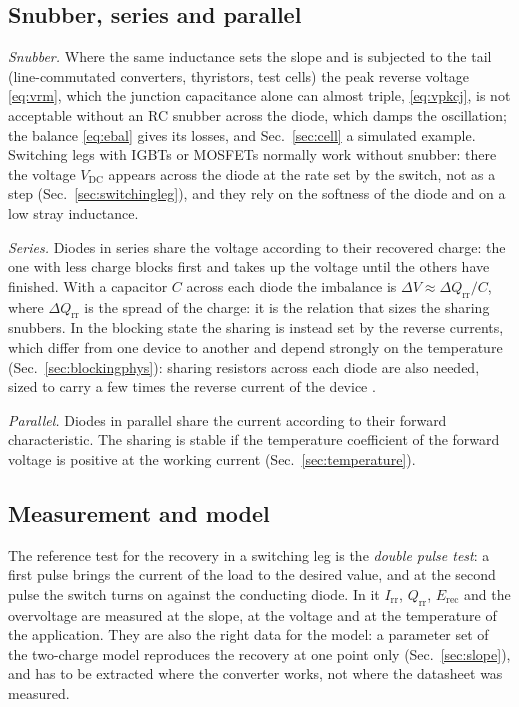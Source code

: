 \documentclass[10pt,a4paper]{scrartcl}
\newcommand{\Irr}{I_\mathrm{rr}}
\newcommand{\Qrr}{Q_\mathrm{rr}}
\newcommand{\Vdc}{V_\mathrm{DC}}
\newcommand{\Erec}{E_\mathrm{rec}}
\begin{document}
\subsection{Snubber, series and parallel}
\emph{Snubber.} Where the same inductance sets the slope and is subjected to the tail (line-commutated converters, thyristors, test cells) the peak reverse voltage \eqref{eq:vrm}, which the junction capacitance alone can almost triple, \eqref{eq:vpkcj}, is not acceptable without an RC snubber across the diode, which damps the oscillation; the balance \eqref{eq:ebal} gives its losses, and Sec.~\ref{sec:cell} a simulated example. Switching legs with IGBTs or MOSFETs normally work without snubber: there the voltage $\Vdc$ appears across the diode at the rate set by the switch, not as a step (Sec.~\ref{sec:switchingleg}), and they rely on the softness of the diode and on a low stray inductance.

\emph{Series.} Diodes in series share the voltage according to their recovered charge: the one with less charge blocks first and takes up the voltage until the others have finished. With a capacitor $C$ across each diode the imbalance is $\Delta V \approx \Delta\Qrr/C$, where $\Delta\Qrr$ is the spread of the charge: it is the relation that sizes the sharing snubbers. In the blocking state the sharing is instead set by the reverse currents, which differ from one device to another and depend strongly on the temperature (Sec.~\ref{sec:blockingphys}): sharing resistors across each diode are also needed, sized to carry a few times the reverse current of the device \cite{dynexan6531,stan443}.

\emph{Parallel.} Diodes in parallel share the current according to their forward characteristic. The sharing is stable if the temperature coefficient of the forward voltage is positive at the working current (Sec.~\ref{sec:temperature}).

\subsection{Measurement and model}
The reference test for the recovery in a switching leg is the \emph{double pulse test}: a first pulse brings the current of the load to the desired value, and at the second pulse the switch turns on against the conducting diode. In it $\Irr$, $\Qrr$, $\Erec$ and the overvoltage are measured at the slope, at the voltage and at the temperature of the application. They are also the right data for the model: a parameter set of the two-charge model reproduces the recovery at one point only (Sec.~\ref{sec:slope}), and has to be extracted where the converter works, not where the datasheet was measured.
\end{document}
